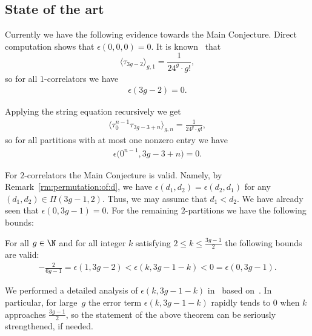 \subsection{State of the art}\label{ss:state:of:the:art}

Currently we have the following evidence towards the Main Conjecture. Direct computation shows that $\epsilon(0,0,0)=0$. It is known~\cite{Witten} that
\[
\langle\tau_{3g-2}\rangle_{g,1}=\frac{1}{24^g\cdot g!} ,
\]
so for all $1$-correlators we have
\begin{gather}\label{eq:epsilon:for:1:correlators}
\epsilon(3g-2)=0 .
\end{gather}

Applying the string equation recursively we get
\begin{gather}
\label{eq:almost:zero:partition}
\big\langle\tau_0^{n-1}\tau_{3g-3+n}\big\rangle_{g,n}=\frac{1}{24^g\cdot g!} ,
\end{gather}
so for all partitions with at most one nonzero entry we have
\begin{gather}\label{eq:epsilon:0:1corr}
\epsilon\big(0^{n-1},3g-3+n\big)=0 .
\end{gather}

For $2$-correlators the Main Conjecture is valid. Namely, by Remark~\ref{rm:permutation:of:d}, we have $\epsilon(d_1,d_2)= \epsilon(d_2,d_1)$ for any $(d_1,d_2)\in\Pi(3g-1,2)$. Thus, we may assume that $d_1<d_2$. We have already seen that $\epsilon(0,3g-1)=0$. For the remaining $2$-partitions we have the following bounds:

\begin{NNTheorem}
For all $g\in\N$ and for all integer $k$ satisfying
$2\le k\le \frac{3g-1}{2}$ the following bounds are valid:
\begin{gather}\label{eq:main:bounds}
- \frac{2}{6g-1}=\epsilon(1,3g-2)< \epsilon(k,3g-1-k)< 0=\epsilon(0,3g-1) .
\end{gather}
\end{NNTheorem}

We performed a detailed analysis of $\epsilon(k,3g-1-k)$ in~\cite{DGZZ:volume}
based on~\cite{Zograf:2:correlators}. In particular, for large~$g$ the error term $\epsilon(k,3g-1-k)$ rapidly tends to $0$ when $k$ approaches $\frac{3g-1}{2}$, so the statement of the above theorem can be seriously strengthened, if needed.
